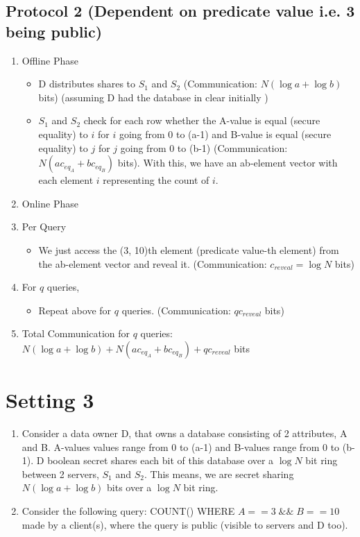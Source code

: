 \subsection{Protocol 2 (Dependent on predicate value i.e. 3 being public)}
\begin{enumerate}
    \item Offline Phase
    \begin{itemize}
        \item D distributes shares to $S_1$ and $S_2$ (Communication: $N(\log a + \log b)$ bits) (assuming D had the database in clear initially
)
        \item $S_1$ and $S_2$ check for each row whether the A-value is equal (secure equality) to $i$ for $i$ going from 0 to (a-1) and B-value is equal (secure equality) to $j$ for $j$ going from 0 to (b-1) (Communication: $N(ac_{eq_A} + bc_{eq_B})$ bits). With this, we have an ab-element vector with each element $i$ representing the count of $i$.
    \end{itemize}
    \item Online Phase
    \item Per Query
    \begin{itemize}
        \item We just access the (3, 10)th element (predicate value-th element) from the ab-element vector and reveal it. (Communication: $c_{reveal} = \log N$ bits) 
    \end{itemize}
    \item For $q$ queries,
    \begin{itemize}
        \item Repeat above for $q$ queries. (Communication: $qc_{reveal}$ bits)
    \end{itemize}
    \item Total Communication for $q$ queries: $N(\log a + \log b) + N(ac_{eq_A} + bc_{eq_B}) + qc_{reveal}$ bits  
\end{enumerate}

\section{Setting 3}
\begin{enumerate}
    \item Consider a data owner D, that owns a database consisting of 2 attributes, A and B. A-values values range from 0 to (a-1) and B-values range from 0 to (b-1). D boolean secret shares each bit of this database over a $\log N$ bit ring between 2 servers, $S_1$ and $S_2$. This means, we are secret sharing $N(\log a + \log b)$ bits over a $\log N$ bit ring. 
    \item Consider the following query: COUNT() WHERE $A == 3 \;\&\&\; B == 10$ made by a client(s), where the query is public (visible to servers and D too).
\end{enumerate}

